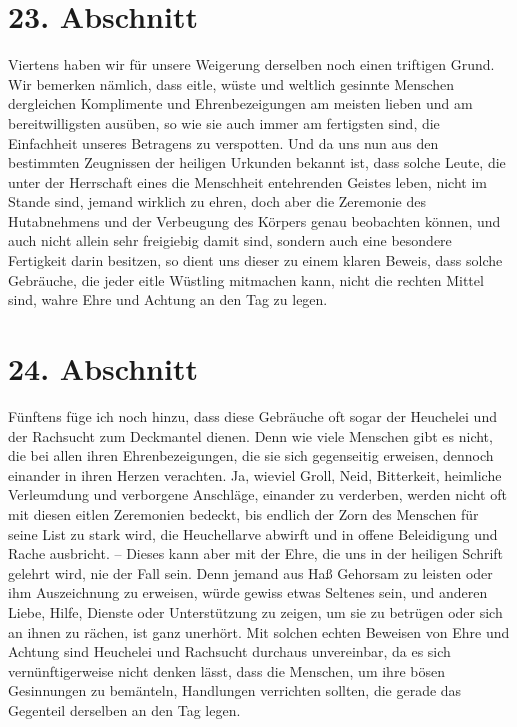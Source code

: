 \section{23. Abschnitt} \label{kap9_ab23}

Viertens haben wir für unsere Weigerung derselben noch einen triftigen Grund.
Wir bemerken nämlich, dass eitle, wüste und weltlich gesinnte Menschen
dergleichen
Komplimente und Ehrenbezeigungen am meisten lieben und am bereitwilligsten
ausüben, so wie sie auch immer am fertigsten sind, die Einfachheit unseres
Betragens zu verspotten. Und da uns nun aus den bestimmten Zeugnissen der
heiligen Urkunden bekannt ist, dass solche Leute, die unter der Herrschaft eines
die Menschheit entehrenden Geistes leben, nicht im Stande sind, jemand wirklich
zu ehren, doch aber die Zeremonie des Hutabnehmens und der Verbeugung des
Körpers genau beobachten können, und auch nicht allein sehr freigiebig damit
sind, sondern auch eine besondere Fertigkeit darin besitzen, so dient uns
dieser zu einem klaren Beweis, dass solche Gebräuche, die jeder eitle Wüstling
mitmachen kann, nicht die rechten Mittel sind, wahre Ehre und Achtung an den Tag
zu legen.

\section{24. Abschnitt} \label{kap9_ab24}

Fünftens füge ich noch hinzu, dass diese Gebräuche oft sogar der
Heuchelei und
der Rachsucht zum Deckmantel dienen. Denn wie viele Menschen gibt es nicht, die
bei allen ihren Ehrenbezeigungen, die sie sich gegenseitig erweisen, dennoch
einander in ihren Herzen verachten. Ja, wieviel Groll, Neid, Bitterkeit,
heimliche Verleumdung und verborgene Anschläge, einander zu verderben, werden
nicht oft mit diesen eitlen Zeremonien bedeckt, bis endlich der Zorn des
Menschen für seine List zu stark wird, die Heuchellarve abwirft und in offene
Beleidigung und Rache ausbricht. -- Dieses kann aber mit der Ehre, die uns in
der heiligen Schrift gelehrt wird, nie der Fall sein. Denn jemand aus Haß
Gehorsam zu leisten oder ihm Auszeichnung zu erweisen, würde gewiss etwas
Seltenes sein, und anderen Liebe, Hilfe, Dienste oder Unterstützung zu zeigen,
um sie zu betrügen oder sich an ihnen zu rächen, ist ganz unerhört. Mit solchen
echten Beweisen von Ehre und Achtung sind Heuchelei und Rachsucht durchaus
unvereinbar, da es sich vernünftigerweise nicht denken lässt, dass die Menschen,
um ihre bösen Gesinnungen zu bemänteln, Handlungen verrichten sollten, die
gerade das Gegenteil derselben an den Tag legen.

